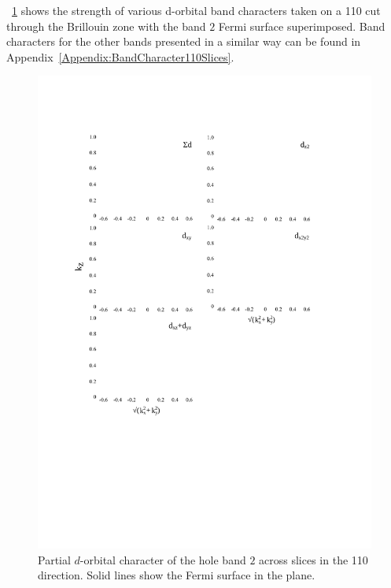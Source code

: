 \Fig~\ref{Fig:ResD:Band2DCharacter} shows the strength of various d-orbital band characters taken on a 110 cut through the \BaFeP Brillouin zone with the band $2$ Fermi surface superimposed. Band characters for the other bands presented in a similar way can be found in Appendix~\ref{Appendix:BandCharacter110Slices}.
\begin{figure}[htbp]
    \begin{center}
        \includegraphics[scale=0.5]{Chapter-dHvABaFe2P2/Figures/AngleDepMeasurements/BandCharacterPlot/Band2_110Slice_BandCharacter}
        \caption{Partial $d$-orbital character of the hole band $2$ across slices in the 110 direction. Solid lines show the Fermi surface in the plane.}
        \label{Fig:ResD:Band2DCharacter}
    \end{center}
\end{figure}
